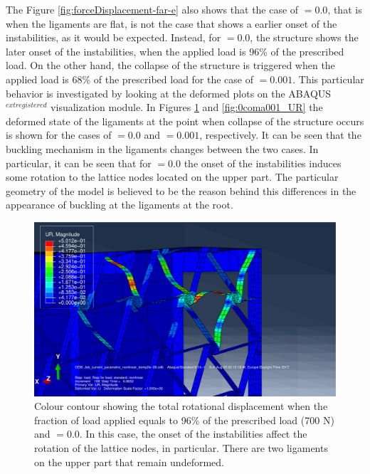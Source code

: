       The Figure \ref{fig:forceDisplacement-far-e} also shows that the case of \chie$ = 0.0$, that is when the ligaments are flat, is not the case that shows a earlier onset of the instabilities, as it would be expected. Instead, for \chie$ = 0.0$, the structure shows the later onset of the instabilities, when the applied load is 96\% of the prescribed load. On the other hand, the collapse of the structure is triggered when the applied load is 68\% of the prescribed load for the case of \chie$ = 0.001$. This particular behavior is investigated by looking at the deformed plots on the ABAQUS$^{	extregistered}$ visualization module. In Figures \ref{fig:0coma0_UR} and \ref{fig:0coma001_UR} the deformed state of the ligaments at the point when collapse of the structure occurs is shown for the cases of \chie$ = 0.0$ and \chie$ = 0.001$, respectively. It can be seen that the buckling mechanism in the ligaments changes between the two cases. In particular, it can be seen that for \chie$ = 0.0$ the onset of the instabilities induces some rotation to the lattice nodes located on the upper part. The particular geometry of the model is believed to be the reason behind this differences in the appearance of buckling at the ligaments at the root. 

      \begin{figure}[!htpb] %
        \centering
        \includegraphics[width=0.7 \textwidth]{figures/result-sim/eccen/0coma0_UR}
        \caption[Colour contour showing the total rotational displacement when the fraction of load applied equals to 96\% of the prescribed load (700 N) and \chie$= 0.0$]{Colour contour showing the total rotational displacement when the fraction of load applied equals to 96\% of the prescribed load (700 N) and \chie$= 0.0$. In this case, the onset of the instabilities affect the rotation of the lattice nodes, in particular. There are two ligaments on the upper part that remain undeformed.}
        \label{fig:0coma0_UR}
      \end{figure}

